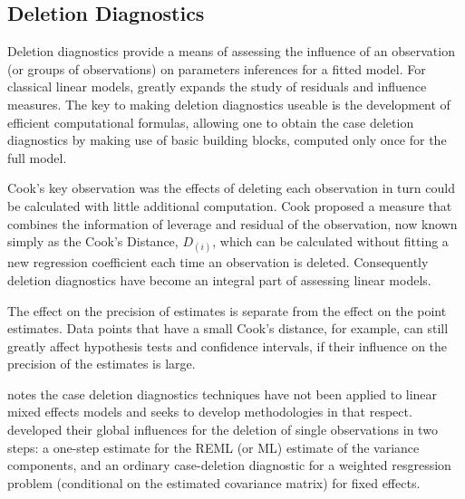 \documentclass[12pt, a4paper]{report}
\theoremstyle{definition}
\theoremstyle{remark}
\begin{document}
	\subsection{Deletion Diagnostics}
	
	
Deletion diagnostics provide a means of assessing the influence of an observation (or groups of observations) on parameters inferences for a fitted model. For classical linear models, \citet{cook77} greatly expands the study of residuals and influence measures. The key to making deletion diagnostics useable is the development of efficient computational formulas, allowing one to obtain the  case deletion diagnostics by making use of basic building blocks, computed only once for the full model.
	
	
Cook's key observation was the effects of deleting each observation in turn could be calculated with little additional computation. Cook proposed a measure that combines the information of leverage and residual of the observation, now known simply as the Cook's Distance, $D_{(i)}$, which can be calculated without fitting a new regression coefficient each time an observation is deleted. Consequently deletion diagnostics have become an integral part of assessing linear models.
	
The effect on the precision of estimates is separate from the effect on the point estimates. Data points that have a small Cook's distance, for example, can still greatly affect hypothesis tests and confidence intervals, if their influence on the precision of the estimates is large.	
	
	
\citet{Christensen} notes the case deletion diagnostics techniques have not been applied to linear mixed effects models and seeks to develop methodologies in that respect. \citet{Christensen} developed their global influences for the deletion of single observations in two steps: a one-step estimate for the REML (or ML) estimate of the variance components, and an ordinary case-deletion diagnostic for a weighted resgression problem (conditional on the estimated covariance matrix) for fixed effects.
	
\end{document}
